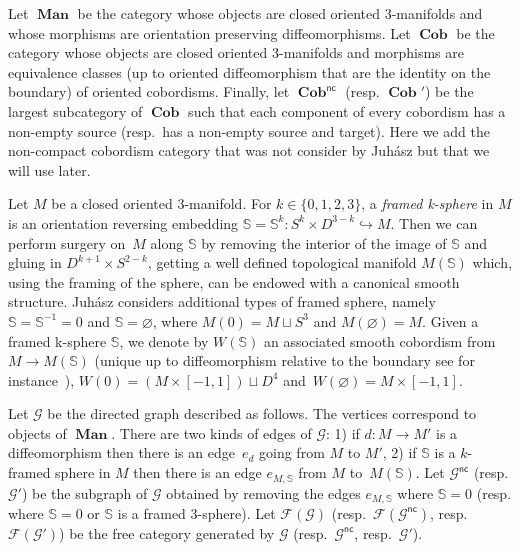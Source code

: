 \documentclass[10pt,a4paper]{amsart}
\numberwithin{equation}{section}
\numberwithin{theorem}{section}
\numberwithin{proposition}{section}
\numberwithin{definition}{section}
\numberwithin{lemma}{section}
\numberwithin{corollary}{section}
\numberwithin{remark}{section}
\numberwithin{example}{section}
\newcommand{\cob}{\operatorname{\textbf{Cob}}}
\newcommand{\nc}[1]{{#1^{\mathsf{nc}}}}
\newcommand{\man}{\operatorname{\textbf{Man}}}
\newcommand{\Sp}{\mathbb{S}}
\begin{document}
Let $\man$ be the category whose objects are closed oriented 3-manifolds and whose morphisms are
orientation preserving diffeomorphisms.
 Let $\cob$ be the category whose objects are closed oriented 3-manifolds and morphisms are equivalence classes (up to oriented diffeomorphism that are the identity on the boundary) of oriented cobordisms.
 Finally, let $\nc\cob$ (resp. $\cob'$) be the largest subcategory of $\cob$ such that each component of every cobordism has a non-empty source (resp.\ has a non-empty source and target).
 Here we add the non-compact cobordism category that
 was not consider
 by Juh\'asz but that we will use later.

Let $M$ be a closed oriented 3-manifold. For
$k\in \{0,1,2,3\}$, a \emph{framed k-sphere} in $M$ is an orientation reversing embedding $\Sp=\Sp^k\colon S^k \times D^{3-k} \hookrightarrow M$.
Then we can perform surgery on~$M$ along $\Sp$ by removing the interior of the image of $\Sp$ and gluing in $D^{k+1} \times S^{2-k}$, getting a well defined topological manifold $M(\Sp)$ which, using the framing of the sphere, can be endowed with a canonical smooth structure.
 Juh\'asz considers additional types of framed sphere, namely $\Sp=\Sp^{-1}=0$ and $\Sp=\varnothing$, where $M(0)=M \sqcup S^3$ and
$M(\varnothing)=M$. Given a framed k-sphere $\Sp$,
 we denote by $W(\Sp)$ an associated smooth cobordism from $M \to M(\Sp)$ (unique up to diffeomorphism relative to the boundary see for instance~\cite[Theorem~3.13]{Mil1965}), $W(0)=(M\times[-1,1])\sqcup D^4$ and~${W(\varnothing)=M\times [-1,1]}$.

Let $\mathcal{G}$ be the directed graph described as follows. The vertices correspond to objects of $\man$. There are two kinds of edges of $\mathcal{G}$: 1) if $d\colon M \to M'$ is a diffeomorphism then there is an edge~$e_d$ going from $M$ to $M'$, 2) if $\Sp$ is a $k$-framed sphere in $M$ then
there is an edge $e_{M,\Sp}$ from $M$ to~$M(\Sp)$. Let $\nc{\mathcal G}$ (resp. $\mathcal{G'}$) be the subgraph of $\mathcal{G}$ obtained by removing the edges $e_{M,\Sp}$ where $\Sp=0$ (resp. where $\Sp=0$ or $\Sp$ is a framed $3$-sphere). Let $\mathcal{F}(\mathcal{G})$ (resp.\ $\mathcal{F}(\nc{\mathcal G})$, resp.\ $\mathcal{F}(\mathcal{G}')$) be the free category generated by $\mathcal{G}$ (resp.\ $\nc{\mathcal G}$, resp.\ $\mathcal{G}'$).
\end{document}
